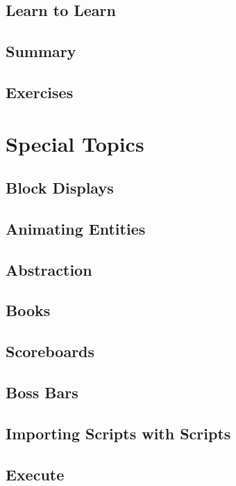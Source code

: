 \documentclass[oneside]{book}
\begin{document}
\section{Learn to Learn}
\blindtext

\section{Summary}
\blindtext

\section{Exercises}
\blindtext

\chapter{Special Topics}
\blindtext

\section{Block Displays}
\blindtext

\section{Animating Entities}
\blindtext

\section{Abstraction}
\blindtext

\section{Books}
\blindtext

\section{Scoreboards}
\blindtext

\section{Boss Bars}
\blindtext

\section{Importing Scripts with Scripts}
\blindtext

\section{Execute}
\blindtext
\end{document}
